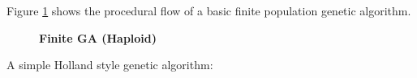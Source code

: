 Figure \ref{FiniteGA} shows the procedural flow of a basic finite population genetic algorithm.
\begin{figure}[H]
\begin{center}
\hspace{4pt}
\caption{\textbf{Finite GA (Haploid)} }
\label{FiniteGA}
\end{center}
\end{figure}

A simple Holland style genetic algorithm:

